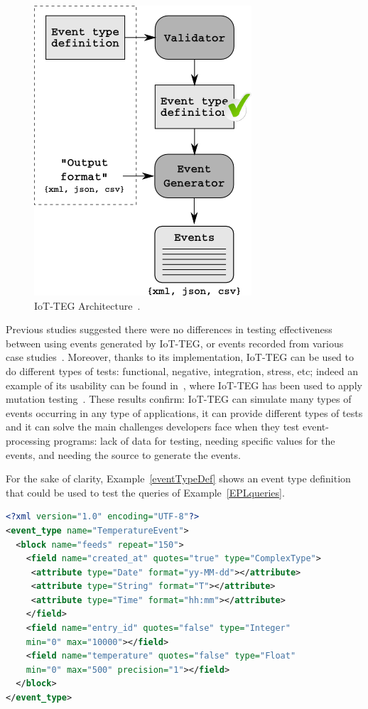 \documentclass[review]{elsarticle}
\begin{document}
\begin{figure}[!ht]
  \centering
  \includegraphics[scale=0.5]{./img/IoT-EGArquitecture}
  \caption[IoT-TEG Architecture]{IoT-TEG Architecture~\cite{TesisGutierrez2017,Gutierrez2017}.}
  \label{fig:IoT-EGArquitecture}
\end{figure}

Previous studies suggested there were no differences in testing effectiveness between using events
generated by IoT-TEG, or events recorded from various case studies~\cite{TesisGutierrez2017,Gutierrez2017}.
Moreover, thanks to its implementation, IoT-TEG can be used to do different types of tests: functional,
negative, integration, stress, etc; indeed an example of its usability can be found 
in~\cite{TesisGutierrez2017,gutierrez2018}, where IoT-TEG has been used to apply mutation 
testing~\cite{jia2011}. These results confirm: IoT-TEG can 
simulate many types of events occurring in any type of applications,
it can provide different types of tests
and it can solve the main challenges developers face when they test event-processing programs: lack of data 
for testing, needing specific values for the events, and needing the source to generate the events.

For the sake of clarity, Example~\ref{eventTypeDef} shows an event type
definition that could be used to test the queries of Example~\ref{EPLqueries}.

\begin{lstlisting}[basicstyle=\ttfamily\footnotesize,language=XML,caption=Event type definition example,label=eventTypeDef]
<?xml version="1.0" encoding="UTF-8"?>
<event_type name="TemperatureEvent">
  <block name="feeds" repeat="150">
    <field name="created_at" quotes="true" type="ComplexType">
     <attribute type="Date" format="yy-MM-dd"></attribute>
     <attribute type="String" format="T"></attribute>
     <attribute type="Time" format="hh:mm"></attribute>
    </field>
    <field name="entry_id" quotes="false" type="Integer" 
    min="0" max="10000"></field>
    <field name="temperature" quotes="false" type="Float" 
    min="0" max="500" precision="1"></field>
  </block>
</event_type>
\end{lstlisting}
\end{document}
